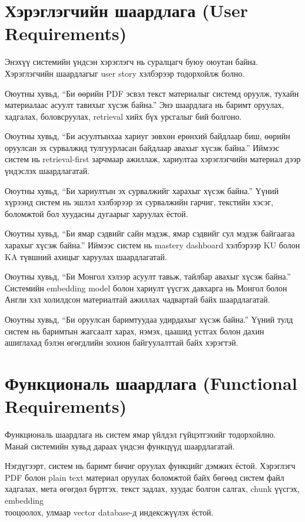 \documentclass[12pt,A4]{report}
\newcommand{\eng}[1]{#1}
\begin{document}
\section{Хэрэглэгчийн шаардлага (User Requirements)}

Энэхүү системийн үндсэн хэрэглэгч нь суралцагч буюу оюутан байна. Хэрэглэгчийн шаардлагыг \eng{user story} хэлбэрээр тодорхойлж болно. 

Оюутны хувьд, ``Би өөрийн \eng{PDF} эсвэл текст материалыг системд оруулж, тухайн материалаас асуулт тавихыг хүсэж байна.'' Энэ шаардлага нь баримт оруулах, хадгалах, боловсруулах, retrieval хийх бүх урсгалыг бий болгоно.

Оюутны хувьд, ``Би асуултынхаа хариуг зөвхөн ерөнхий байдлаар биш, өөрийн \\оруулсан эх сурвалжид тулгуурласан байдлаар авахыг хүсэж байна.'' Иймээс систем нь retrieval-first зарчмаар ажиллаж, хариултаа хэрэглэгчийн материал дээр үндэслэх шаардлагатай. 

Оюутны хувьд, ``Би хариултын эх сурвалжийг харахыг хүсэж байна.'' Үүний хүрээнд систем нь эшлэл хэлбэрээр эх сурвалжийн гарчиг, текстийн хэсэг, боломжтой бол хуудасны дугаарыг харуулах ёстой. 

Оюутны хувьд, ``Би ямар сэдвийг сайн мэдэж, ямар сэдвийг сул мэдэж байгаагаа харахыг хүсэж байна.'' Иймээс систем нь \eng{mastery dashboard} хэлбэрээр \eng{KU} болон \eng{KA} түвшний ахицыг харуулах шаардлагатай. 

Оюутны хувьд, ``Би Монгол хэлээр асуулт тавьж, тайлбар авахыг хүсэж байна.'' Системийн \eng{embedding model} болон хариулт үүсгэх давхарга нь Монгол болон Англи хэл холилдсон материалтай ажиллах чадвартай байх шаардлагатай. 

Оюутны хувьд, ``Би оруулсан баримтуудаа удирдахыг хүсэж байна.'' Үүний тулд систем нь баримтын жагсаалт харах, нэмэх, цаашид устгах болон дахин ашиглахад бэлэн өгөгдлийн зохион байгуулалттай байх хэрэгтэй.

\section{Функциональ шаардлага (Functional Requirements)}

Функциональ шаардлага нь систем ямар үйлдэл гүйцэтгэхийг тодорхойлно. Манай системийн хувьд дараах үндсэн функцүүд шаардлагатай. 

Нэгдүгээрт, систем нь баримт бичиг оруулах функцийг дэмжих ёстой. Хэрэглэгч \eng{PDF} болон plain text материал оруулах боломжтой байх бөгөөд систем файл хадгалах, мета өгөгдөл бүртгэх, текст задлах, хуудас болгон салгах, \eng{chunk} үүсгэх, \eng{embedding} \\тооцоолох, улмаар \eng{vector database}-д индексжүүлэх ёстой. 
\end{document}
